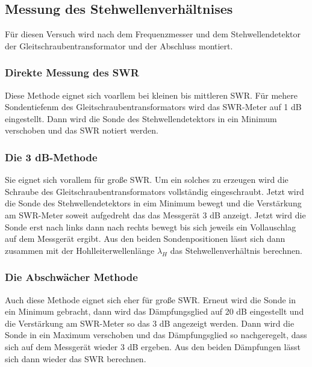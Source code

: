 \subsection{Messung des Stehwellenverhältnises}
\label{sec:dfswr}
Für diesen Versuch wird nach dem Frequenzmesser und dem Stehwellendetektor der Gleitschraubentransformator und
der Abschluss montiert.

\subsubsection{Direkte Messung des SWR}
\label{sec:dfswrdirekt}
Diese Methode eignet sich voarllem bei kleinen bis mittleren SWR. Für mehere Sondentiefenm des 
Gleitschraubentransformators wird das SWR-Meter auf 1 dB eingestellt. Dann wird die Sonde des Stehwellendetektors
in ein Minimum verschoben und das SWR notiert werden.

\subsubsection{Die 3 dB-Methode}
\label{sec:dfdreidb}
Sie eignet sich vorallem für große SWR. Um ein solches zu erzeugen wird die Schraube des Gleitschraubentransformators
vollständig eingeschraubt. Jetzt wird die Sonde des Stehwellendetektors in eim Minimum bewegt und die Verstärkung
am SWR-Meter soweit aufgedreht das das Messgerät 3 dB anzeigt. Jetzt wird die Sonde erst nach links dann nach rechts
bewegt bis sich jeweils ein Vollauschlag auf dem Messgerät ergibt. Aus den beiden Sondenpositionen lässt sich dann
zusammen mit der Hohlleiterwellenlänge $\lambda_H$ das Stehwellenverhältnis berechnen.

\subsubsection{Die Abschwächer Methode}
\label{sec:dfabschwaecher}
Auch  diese Methode eignet sich eher für große SWR. Erneut wird die Sonde in ein Minimum gebracht, dann wird das 
Dämpfungsglied auf 20 dB eingestellt und die Verstärkung am SWR-Meter so das 3 dB angezeigt werden. Dann wird 
die Sonde in ein Maximum verschoben und das Dämpfungsglied so nachgeregelt, dass sich auf dem Messgerät wieder 3 dB 
ergeben. Aus den beiden Dämpfungen lässt sich dann wieder das SWR berechnen.